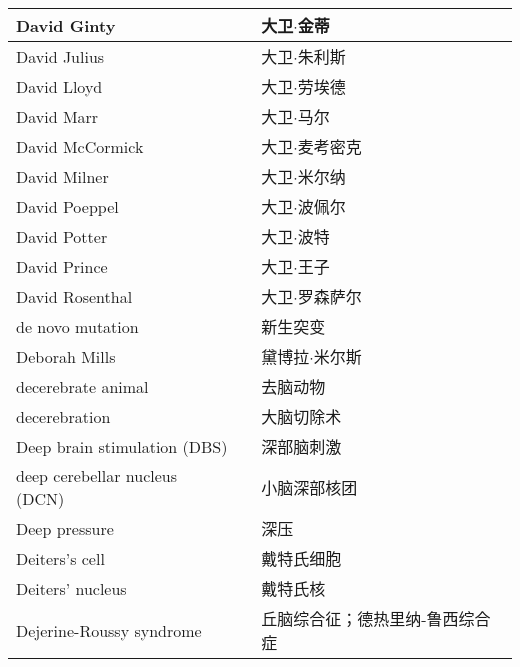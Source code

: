 \begin{longtable}{lll}
	\midrule
	David Ginty     &&  大卫$\cdot$金蒂  \\
	
	\midrule
	David Julius     &&  大卫$\cdot$朱利斯  \\
	
	\midrule
	David Lloyd     &&  大卫$\cdot$劳埃德  \\
	
	\midrule
	David Marr     &&  大卫$\cdot$马尔  \\
	
	\midrule
	David McCormick     &&  大卫$\cdot$麦考密克  \\
	
	\midrule
	David Milner     &&  大卫$\cdot$米尔纳  \\
	
	\midrule
	David Poeppel     &&  大卫$\cdot$波佩尔  \\
	
	\midrule
	David Potter     &&  大卫$\cdot$波特  \\
	
	\midrule
	David Prince     &&  大卫$\cdot$王子  \\
	
	\midrule
	David Rosenthal     &&  大卫$\cdot$罗森萨尔  \\
	
	\midrule
	de novo mutation     &&  新生突变  \\
	
	\midrule
	Deborah Mills     &&  黛博拉$\cdot$米尔斯  \\
	
	\midrule
	decerebrate animal     &&  去脑动物  \\
	
	\midrule
	decerebration     &&  大脑切除术  \\
	
	\midrule
	Deep brain stimulation (DBS)     &&  深部脑刺激  \\
	
	\midrule
	deep cerebellar nucleus (DCN)  &&  小脑深部核团  \\
	
	\midrule
	Deep pressure   &&  深压  \\
	
	\midrule
	Deiters's cell   &&  戴特氏细胞  \\
	
	\midrule
	Deiters' nucleus   &&  戴特氏核  \\
	
	\midrule
	Dejerine-Roussy syndrome   &&  丘脑综合征；德热里纳-鲁西综合症  \\
	

\end{longtable}
